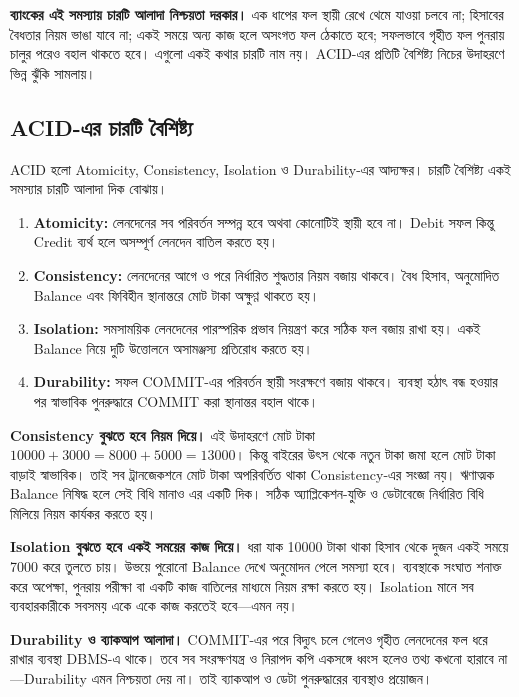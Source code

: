\textbf{ব্যাংকের এই সমস্যায় চারটি আলাদা নিশ্চয়তা দরকার।} এক ধাপের ফল স্থায়ী রেখে থেমে যাওয়া চলবে না; হিসাবের বৈধতার নিয়ম ভাঙা যাবে না; একই সময়ে অন্য কাজ হলে অসংগত ফল ঠেকাতে হবে; সফলভাবে গৃহীত ফল পুনরায় চালুর পরেও বহাল থাকতে হবে। এগুলো একই কথার চারটি নাম নয়। ACID-এর প্রতিটি বৈশিষ্ট্য নিচের উদাহরণে ভিন্ন ঝুঁকি সামলায়।

\subsection{ACID-এর চারটি বৈশিষ্ট্য}
ACID হলো Atomicity, Consistency, Isolation ও Durability-এর আদ্যক্ষর। চারটি বৈশিষ্ট্য একই সমস্যার চারটি আলাদা দিক বোঝায়।
\begin{enumerate}
\item \textbf{Atomicity:} লেনদেনের সব পরিবর্তন সম্পন্ন হবে অথবা কোনোটিই স্থায়ী হবে না। Debit সফল কিন্তু Credit ব্যর্থ হলে অসম্পূর্ণ লেনদেন বাতিল করতে হয়।
\item \textbf{Consistency:} লেনদেনের আগে ও পরে নির্ধারিত শুদ্ধতার নিয়ম বজায় থাকবে। বৈধ হিসাব, অনুমোদিত Balance এবং ফিবিহীন স্থানান্তরে মোট টাকা অক্ষুণ্ণ থাকতে হয়।
\item \textbf{Isolation:} সমসাময়িক লেনদেনের পারস্পরিক প্রভাব নিয়ন্ত্রণ করে সঠিক ফল বজায় রাখা হয়। একই Balance নিয়ে দুটি উত্তোলনে অসামঞ্জস্য প্রতিরোধ করতে হয়।
\item \textbf{Durability:} সফল COMMIT-এর পরিবর্তন স্থায়ী সংরক্ষণে বজায় থাকবে। ব্যবস্থা হঠাৎ বন্ধ হওয়ার পর স্বাভাবিক পুনরুদ্ধারে COMMIT করা স্থানান্তর বহাল থাকে।
\end{enumerate}
\textbf{Consistency বুঝতে হবে নিয়ম দিয়ে।} এই উদাহরণে মোট টাকা $10000+3000=8000+5000=13000$। কিন্তু বাইরের উৎস থেকে নতুন টাকা জমা হলে মোট টাকা বাড়াই স্বাভাবিক। তাই সব ট্রানজেকশনে মোট টাকা অপরিবর্তিত থাকা Consistency-এর সংজ্ঞা নয়। ঋণাত্মক Balance নিষিদ্ধ হলে সেই বিধি মানাও এর একটি দিক। সঠিক অ্যাপ্লিকেশন-যুক্তি ও ডেটাবেজে নির্ধারিত বিধি মিলিয়ে নিয়ম কার্যকর করতে হয়।

\textbf{Isolation বুঝতে হবে একই সময়ের কাজ দিয়ে।} ধরা যাক 10000 টাকা থাকা হিসাব থেকে দুজন একই সময়ে 7000 করে তুলতে চায়। উভয়ে পুরোনো Balance দেখে অনুমোদন পেলে সমস্যা হবে। ব্যবস্থাকে সংঘাত শনাক্ত করে অপেক্ষা, পুনরায় পরীক্ষা বা একটি কাজ বাতিলের মাধ্যমে নিয়ম রক্ষা করতে হয়। Isolation মানে সব ব্যবহারকারীকে সবসময় একে একে কাজ করতেই হবে—এমন নয়।

\textbf{Durability ও ব্যাকআপ আলাদা।} COMMIT-এর পরে বিদ্যুৎ চলে গেলেও গৃহীত লেনদেনের ফল ধরে রাখার ব্যবস্থা DBMS-এ থাকে। তবে সব সংরক্ষণযন্ত্র ও নিরাপদ কপি একসঙ্গে ধ্বংস হলেও তথ্য কখনো হারাবে না—Durability এমন নিশ্চয়তা দেয় না। তাই ব্যাকআপ ও ডেটা পুনরুদ্ধারের ব্যবস্থাও প্রয়োজন।

